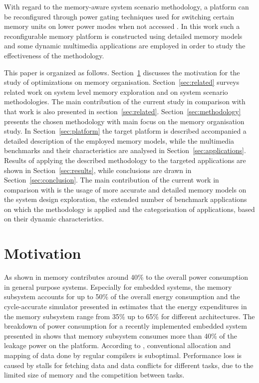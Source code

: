 \documentclass[a4paper,conference]{IEEEtran}
\begin{document}
With regard to the memory-aware system scenario methodology, a platform can be reconfigured through power gating techniques used for switching certain memory units on lower power modes when not accessed \cite{Fil12}. In this work such a reconfigurable memory platform is constructed using detailed memory models and some dynamic multimedia applications are employed in order to study the effectiveness of the methodology.

This paper is organized as follows. Section~\ref{sec:motivation} discusses the motivation for the study of optimizations on memory organisation. Section~\ref{sec:related} surveys related work on system level memory exploration and on system scenario methodologies. The main contribution of the current study in comparison with that work is also presented in section~\ref{sec:related}. Section~\ref{sec:methodology} presents the chosen methodology with main focus on the memory organisation study. In Section~\ref{sec:platform} the target platform is described accompanied a detailed description of the employed memory models, while the multimedia benchmarks and their characteristics are analysed in Section~\ref{sec:applications}. Results of applying the described methodology to the targeted applications are shown in Section~\ref{sec:results}, while conclusions are drawn in Section~\ref{sec:conclusion}. The main contribution of the current work in comparison with \cite{Fil12} is the usage of more accurate and detailed memory models on the system design exploration, the extended number of benchmark applications on which the methodology is applied and the categorisation of applications, based on their dynamic characteristics.

\section{Motivation}
\label{sec:motivation}

As shown in \cite{Gonzalez1996} memory contributes around 40\% to the overall power consumption in general purpose systems. Especially for embedded systems, the memory subsystem accounts for up to 50\% of the overall energy consumption \cite{Che09} and the cycle-accurate simulator presented in \cite{Ben99} estimates that the energy expenditures in the memory subsystem range from 35\% up to 65\% for different architectures. The breakdown of power consumption for a recently implemented embedded system presented in \cite{Hul11} shows that memory subsystem consumes more than 40\% of the leakage power on the platform. According to \cite{tcm}, conventional allocation and mapping of data done by regular compilers is suboptimal. Performance loss is caused by stalls for fetching data and data conflicts for different tasks, due to the limited size of memory and the competition between tasks. 
\end{document}
